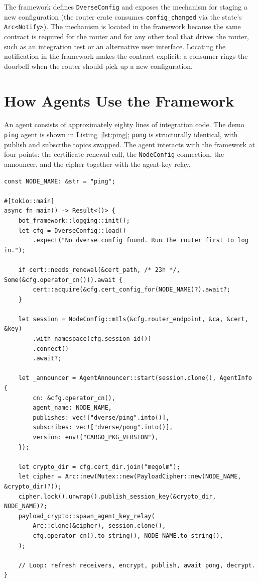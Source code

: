 \documentclass[11pt,a4paper]{article}
\begin{document}
The framework defines \texttt{DverseConfig} and exposes the
mechanism for staging a new configuration (the router crate
consumes \texttt{config\_changed} via the state's
\texttt{Arc<Notify>}). The mechanism is located in the framework
because the same contract is required for the router and for any
other tool that drives the router, such as an integration test or
an alternative user interface. Locating the notification in the
framework makes the contract explicit: a consumer rings the
doorbell when the router should pick up a new configuration.

\section{How Agents Use the Framework}

An agent consists of approximately eighty lines of integration
code. The demo \texttt{ping} agent is shown in
Listing~\ref{lst:ping}; \texttt{pong} is structurally identical,
with publish and subscribe topics swapped. The agent interacts
with the framework at four points: the certificate renewal call,
the \texttt{NodeConfig} connection, the announcer, and the
cipher together with the agent-key relay.

\begin{lstlisting}[caption={The full \texttt{ping} agent
(\texttt{src/ping/src/main.rs}).},label={lst:ping}]
const NODE_NAME: &str = "ping";

#[tokio::main]
async fn main() -> Result<()> {
    bot_framework::logging::init();
    let cfg = DverseConfig::load()
        .expect("No dverse config found. Run the router first to log in.");

    if cert::needs_renewal(&cert_path, /* 23h */, Some(&cfg.operator_cn())).await {
        cert::acquire(&cfg.cert_config_for(NODE_NAME)?).await?;
    }

    let session = NodeConfig::mtls(&cfg.router_endpoint, &ca, &cert, &key)
        .with_namespace(cfg.session_id())
        .connect()
        .await?;

    let _announcer = AgentAnnouncer::start(session.clone(), AgentInfo {
        cn: &cfg.operator_cn(),
        agent_name: NODE_NAME,
        publishes: vec!["dverse/ping".into()],
        subscribes: vec!["dverse/pong".into()],
        version: env!("CARGO_PKG_VERSION"),
    });

    let crypto_dir = cfg.cert_dir.join("megolm");
    let cipher = Arc::new(Mutex::new(PayloadCipher::new(NODE_NAME, &crypto_dir)?));
    cipher.lock().unwrap().publish_session_key(&crypto_dir, NODE_NAME)?;
    payload_crypto::spawn_agent_key_relay(
        Arc::clone(&cipher), session.clone(),
        cfg.operator_cn().to_string(), NODE_NAME.to_string(),
    );

    // Loop: refresh receivers, encrypt, publish, await pong, decrypt.
}
\end{lstlisting}
\end{document}
